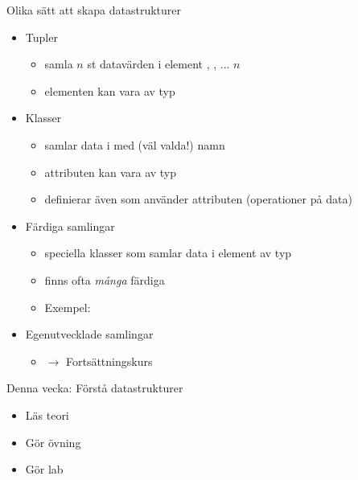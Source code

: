 \begin{Slide}{Olika sätt att skapa datastrukturer}
\begin{itemize}
\item Tupler
  \begin{itemize}
  \item samla $n$ st datavärden i element , , ...  \code{_}$n$
  \item elementen kan vara av  typ
  \end{itemize}
\item Klasser   
  \begin{itemize}
  \item samlar data i  med (väl valda!) namn
  \item attributen kan vara av  typ
  \item definierar även  som använder attributen (operationer på data)
  \end{itemize}

\item Färdiga samlingar 
  \begin{itemize}
  \item speciella klasser som samlar data i element av  typ
  \item finns ofta \emph{många} färdiga  
  \item Exempel: 
  \end{itemize}
  
\item Egenutvecklade samlingar
  \begin{itemize}
  \item $\rightarrow$ Fortsättningskurs
  \end{itemize}
  
\end{itemize}
\end{Slide}



\ifkompendium\else
\begin{Slide}{Denna vecka: Förstå datastrukturer}
\begin{itemize}
\item Läs teori
\item Gör övning 
\item Gör lab 
\end{itemize}
\end{Slide}
\fi